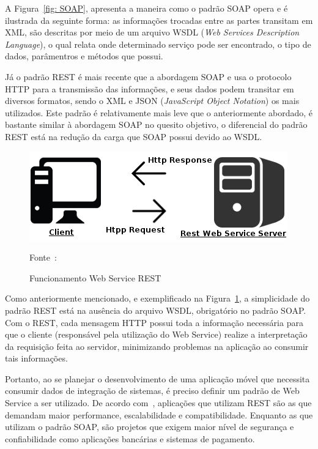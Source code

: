 A Figura~\ref{fig: SOAP}, apresenta a maneira como o padrão SOAP opera e é ilustrada da seguinte forma: as informações trocadas entre as partes transitam em XML, são descritas por meio de um arquivo WSDL (\textit{Web Services Description Language}), o qual relata onde determinado serviço pode ser encontrado, o tipo de dados, parâmentros e métodos que possui.


Já o padrão REST é mais recente que a abordagem SOAP e usa o protocolo HTTP para a transmissão das informações, e seus dados podem transitar em diversos formatos, sendo o XML e JSON (\textit{JavaScript Object Notation}) os mais utilizados.
Este padrão é relativamente mais leve que o anteriormente abordado\cite{tihomirovs2016webservices}, é bastante similar à abordagem SOAP no quesito objetivo, o diferencial do padrão REST está na redução da carga que SOAP possui devido ao WSDL\cite{eulalio2016webservices}.

\begin{figure}[H]
    \centering
    \includegraphics{imagens/rest}
    \caption{Funcionamento Web Service REST}
    Fonte~\cite{eulalio2016webservices}:
    \label{fig: REST}
\end{figure}

Como anteriormente mencionado, e exemplificado na Figura~\ref{fig: REST}, a simplicidade do padrão REST está na ausência do arquivo WSDL, obrigatório no padrão SOAP. Com o REST, cada mensagem HTTP possui toda a informação necessária para que o cliente (responsável pela utilização do Web Service) realize a interpretação da requisição feita ao servidor, minimizando problemas na aplicação ao consumir tais informações\cite{eulalio2016webservices}.

Portanto, ao se planejar o desenvolvimento de uma aplicação móvel que necessita consumir dados de integração de sistemas, é preciso definir um padrão de Web Service a ser utilizado.
De acordo com~\cite{tihomirovs2016webservices}, aplicações que utilizam REST são as que demandam maior performance, escalabilidade e compatibilidade.
Enquanto as que utilizam o padrão SOAP, são projetos que exigem maior nível de segurança e confiabilidade como aplicações bancárias e sistemas de pagamento.



